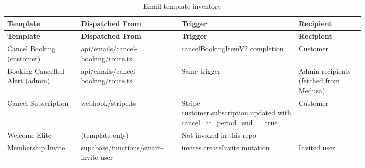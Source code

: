 \begingroup
\setlength{\LTleft}{\fill}
\setlength{\LTright}{\fill}
\setlength{\LTcapwidth}{\linewidth}
\setlength{\tabcolsep}{4pt}
\footnotesize
\renewcommand{\arraystretch}{1.4}
\captionsetup{justification=raggedright,singlelinecheck=false}
\begin{longtable}{|>{\centering\arraybackslash}p{0.18\linewidth}|>{\centering\arraybackslash}p{0.22\linewidth}|>{\centering\arraybackslash}p{0.27\linewidth}|>{\centering\arraybackslash}p{0.16\linewidth}|}
\caption{Email template inventory}
\label{tab:email-templates} \\
\hline
\textbf{Template} & \textbf{Dispatched From} & \textbf{Trigger} & \textbf{Recipient} \\
\hline
\endfirsthead
\hline
\textbf{Template} & \textbf{Dispatched From} & \textbf{Trigger} & \textbf{Recipient} \\
\hline
\endhead
\hline
\endfoot

Cancel Booking (customer)
  & {\ttfamily\small api/\allowbreak emails/\allowbreak cancel-booking/\allowbreak route.ts}
  & {\ttfamily\small cancelBookingItemV2} completion
  & Customer \\
\hline

Booking Cancelled Alert (admin)
  & {\ttfamily\small api/\allowbreak emails/\allowbreak cancel-booking/\allowbreak route.ts}
  & Same trigger
  & Admin recipients (fetched from Medusa) \\
\hline

Cancel Subscription
  & {\ttfamily\small webhook/\allowbreak stripe.ts}
  & Stripe {\ttfamily\small customer.\allowbreak subscription.\allowbreak updated} with {\ttfamily\small cancel\_at\_\allowbreak period\_end~=~true}
  & Customer \\
\hline

Welcome Elite
  & (template only)
  & Not invoked in this repo
  & --- \\
\hline

Membership Invite
  & {\ttfamily\small supabase/\allowbreak functions/\allowbreak smart-invite-user}
  & {\ttfamily\small invites.\allowbreak createInvite} mutation
  & Invited user \\
\hline

\end{longtable}
\endgroup
